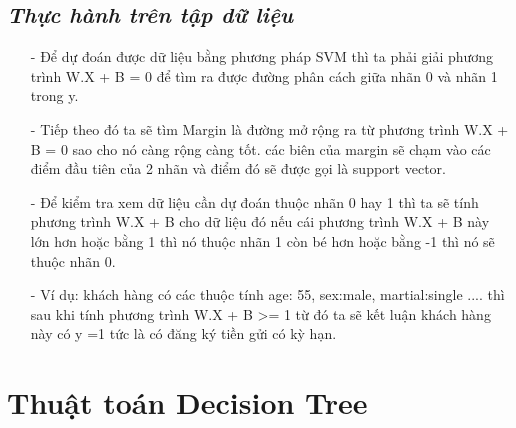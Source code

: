 \documentclass{report}
\begin{document}
\subsection{\textit{Thực hành trên tập dữ liệu}}
    \fontsize{13}{14}\selectfont
    \begin{enumerate}
                \item[- ] Để dự đoán được dữ liệu bằng phương pháp SVM thì ta phải giải phương trình W.X + B = 0 để tìm ra được đường phân cách giữa nhãn 0 và nhãn 1 trong y.
                \item[- ] Tiếp theo đó ta sẽ tìm Margin là đường mở rộng ra từ phương trình W.X + B = 0 sao cho nó càng rộng càng tốt. các biên của margin sẽ chạm vào các điểm đầu tiên của 2 nhãn và điểm đó sẽ được gọi là support vector.
                \item[- ]Để kiểm tra xem dữ liệu cần dự đoán thuộc nhãn 0 hay 1 thì ta sẽ tính phương trình W.X + B cho dữ liệu đó nếu cái phương trình W.X + B này lớn hơn hoặc bằng 1 thì nó thuộc nhãn 1 còn bé hơn hoặc bằng -1 thì nó sẽ thuộc nhãn 0.
                \item[- ] Ví dụ: khách hàng có các thuộc tính {age: 55, sex:male, martial:single ....} thì sau khi tính phương trình W.X + B >= 1 từ đó ta sẽ kết luận khách hàng này có y =1 tức là có đăng ký tiền gửi có kỳ hạn.
    \end{enumerate}

\fontsize{14}{10}\selectfont
\section{Thuật toán Decision Tree}
\end{document}
